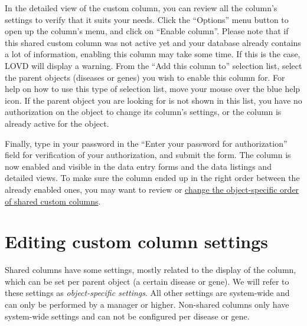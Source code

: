 In the detailed view of the custom column, you can review all the column's settings to verify that it suits your needs.
Click the ``Options'' menu button to open up the column's menu, and click on ``Enable column''.
Please note that if this shared custom column was not active yet and your database already contains a lot of information, enabling this column may take some time.
If this is the case, LOVD will display a warning.
From the ``Add this column to'' selection list, select the parent objects (diseases or genes) you wish to enable this column for.
For help on how to use this type of selection list, move your mouse over the blue help icon.
If the parent object you are looking for is not shown in this list, you have no authorization on the object to change its column's settings, or the column is already active for the object.

Finally, type in your password in the ``Enter your password for authorization'' field for verification of your authorization, and submit the form.
The column is now enabled and visible in the data entry forms and the data listings and detailed views.
To make sure the column ended up in the right order between the already enabled ones,
 you may want to review or \hyperlink{ssec:columns_order_shared}{change the object-specific order of shared custom columns}.





\section{Editing custom column settings}
Shared columns have some settings, mostly related to the display of the column, which can be set per parent object (a certain disease or gene).
We will refer to these settings as \emph{object-specific settings}.
All other settings are system-wide and can only be performed by a manager or higher.
Non-shared columns only have system-wide settings and can not be configured per disease or gene.



